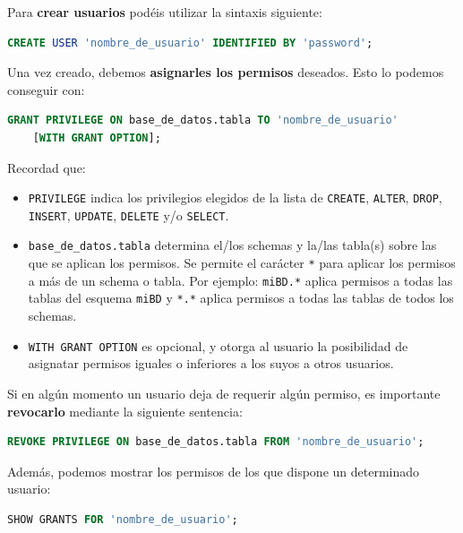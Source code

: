 \documentclass{db-practice}
\begin{document}
Para \textbf{crear usuarios} podéis utilizar la sintaxis siguiente:

\begin{lstlisting}[language=SQL]
CREATE USER 'nombre_de_usuario' IDENTIFIED BY 'password';
\end{lstlisting}

Una vez creado, debemos \textbf{asignarles los permisos} deseados. Esto lo podemos conseguir con:

\begin{lstlisting}[language=SQL]
GRANT PRIVILEGE ON base_de_datos.tabla TO 'nombre_de_usuario' 
    [WITH GRANT OPTION];
\end{lstlisting}

Recordad que:

\begin{itemize}
    \item \texttt{PRIVILEGE} indica los privilegios elegidos de la lista de \texttt{CREATE}, \texttt{ALTER}, \texttt{DROP}, \texttt{INSERT}, \texttt{UPDATE}, \texttt{DELETE} y/o \texttt{SELECT}.
    
    \item \texttt{base\_de\_datos.tabla} determina el/los schemas y la/las tabla(s) sobre las que se aplican los permisos. Se permite el carácter \texttt{*} para aplicar los permisos a más de un schema o tabla. Por ejemplo: \texttt{miBD.*}  aplica permisos a todas las tablas del esquema \texttt{miBD} y \texttt{*.*}  aplica permisos a todas las tablas de todos los schemas.
    
    \item \texttt{WITH GRANT OPTION} es opcional, y otorga al usuario la posibilidad de asignatar permisos iguales o inferiores a los suyos a otros usuarios.
\end{itemize}

Si en algún momento un usuario deja de requerir algún permiso, es importante \textbf{revocarlo} mediante la siguiente sentencia:

\begin{lstlisting}[language=SQL]
REVOKE PRIVILEGE ON base_de_datos.tabla FROM 'nombre_de_usuario';
\end{lstlisting}

Además, podemos mostrar los permisos de los que dispone un determinado usuario:

\begin{lstlisting}[language=SQL]
SHOW GRANTS FOR 'nombre_de_usuario';
\end{lstlisting}
\end{document}
